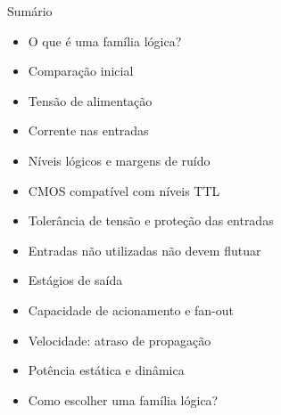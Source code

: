 
\begin{frame}{Sumário}
    \begin{itemize}
        \item O que é uma família lógica?
        \item Comparação inicial
        \item Tensão de alimentação
        \item Corrente nas entradas
        \item Níveis lógicos e margens de ruído
        \item CMOS compatível com níveis TTL
        \item Tolerância de tensão e proteção das entradas
        \item Entradas não utilizadas não devem flutuar
        \item Estágios de saída
        \item Capacidade de acionamento e fan-out
        \item Velocidade: atraso de propagação
        \item Potência estática e dinâmica
        \item Como escolher uma família lógica?
    \end{itemize}
\end{frame}